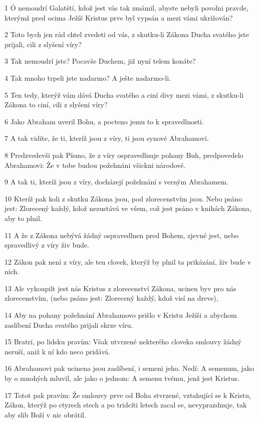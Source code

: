 \par 1 Ó nemoudrí Galatští, kdož jest vás tak zmámil, abyste nebyli povolni pravde, kterýmž pred ocima Ježíš Kristus prve byl vypsán a mezi vámi ukrižován?
\par 2 Toto bych jen rád chtel zvedeti od vás, z skutku-li Zákona Ducha svatého jste prijali, cili z slyšení víry?
\par 3 Tak nemoudrí jste? Pocavše Duchem, již nyní telem konáte?
\par 4 Tak mnoho trpeli jste nadarmo? A ješte nadarmo-li.
\par 5 Ten tedy, kterýž vám dává Ducha svatého a ciní divy mezi vámi, z skutku-li Zákona to ciní, cili z slyšení víry?
\par 6 Jako Abraham uveril Bohu, a pocteno jemu to k spravedlnosti.
\par 7 A tak vidíte, že ti, kteríž jsou z víry, ti jsou synové Abrahamovi.
\par 8 Predzvedevši pak Písmo, že z víry ospravedlnuje pohany Buh, predpovedelo Abrahamovi: Že v tobe budou požehnáni všickni národové.
\par 9 A tak ti, kteríž jsou z víry, docházejí požehnání s verným Abrahamem.
\par 10 Kteríž pak koli z skutku Zákona jsou, pod zlorecenstvím jsou. Nebo psáno jest: Zlorecený každý, kdož nezustává ve všem, což jest psáno v knihách Zákona, aby to plnil.
\par 11 A že z Zákona nebývá žádný ospravedlnen pred Bohem, zjevné jest, nebo spravedlivý z víry živ bude.
\par 12 Zákon pak není z víry, ale ten clovek, kterýž by plnil ta prikázání, živ bude v nich.
\par 13 Ale vykoupilt jest nás Kristus z zlorecenství Zákona, ucinen byv pro nás zlorecenstvím, (nebo psáno jest: Zlorecený každý, kdož visí na dreve),
\par 14 Aby na pohany požehnání Abrahamovo prišlo v Kristu Ježíši a abychom zaslíbení Ducha svatého prijali skrze víru.
\par 15 Bratrí, po lidsku pravím: Však utvrzené nekterého cloveka smlouvy žádný neruší, aniž k ní kdo neco pridává.
\par 16 Abrahamovi pak ucinena jsou zaslíbení, i semeni jeho. Nedí: A semenum, jako by o mnohých mluvil, ale jako o jednom: A semenu tvému, jenž jest Kristus.
\par 17 Totot pak pravím: Že smlouvy prve od Boha stvrzené, vztahující se k Kristu, Zákon, kterýž po ctyrech stech a po tridcíti letech zacal se, nevyprazdnuje, tak aby slib Boží v nic obrátil.
